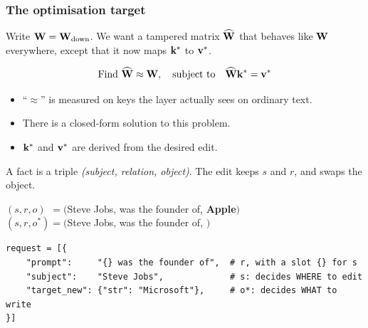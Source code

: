 \begin{frame}
\frametitle{The optimisation target}
Write $\mathbf{W} = \mathbf{W}_{\text{down}}$. We want a tampered matrix $\widehat{\mathbf{W}}$ that
behaves like $\mathbf{W}$ everywhere, except that it now maps $\mathbf{k}^*$ to $\mathbf{v}^*$.
\begin{block}{}
$$
\text{Find } \widehat{\mathbf{W}} \approx \mathbf{W}, \quad \text{subject to} \quad \widehat{\mathbf{W}}\mathbf{k}^* = \mathbf{v}^*
$$
\end{block}
\begin{itemize}
    \item ``$\approx$'' is measured on keys the layer actually sees on ordinary text.
    \item There is a closed-form solution to this problem.
    \item $\mathbf{k}^*$ and $\mathbf{v}^*$ are derived from the desired edit.
\end{itemize}
\end{frame}

\begin{frame}[fragile]
A fact is a triple \textit{(subject, relation, object)}. The edit keeps $s$
and $r$, and swaps the object.
\begin{block}{}
\centering
$(s, r, o)\phantom{^*} = ($Steve Jobs, was the founder of, \textbf{Apple}$)$\\[2pt]
$(s, r, o^*) = ($Steve Jobs, was the founder of, $)$
\end{block}
\begin{lstlisting}
request = [{
    "prompt":     "{} was the founder of",  # r, with a slot {} for s
    "subject":    "Steve Jobs",             # s: decides WHERE to edit
    "target_new": {"str": "Microsoft"},     # o*: decides WHAT to write
}]
\end{lstlisting}
\end{frame}

